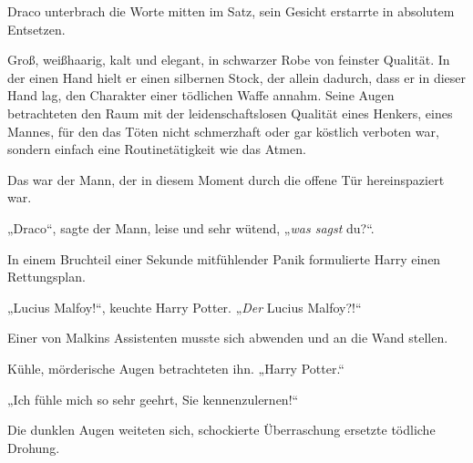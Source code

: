 Draco unterbrach die Worte mitten im Satz, sein Gesicht erstarrte in absolutem Entsetzen.

Groß, weißhaarig, kalt und elegant, in schwarzer Robe von feinster Qualität. In der einen Hand hielt er einen silbernen Stock, der allein dadurch, dass er in dieser Hand lag, den Charakter einer tödlichen Waffe annahm. Seine Augen betrachteten den Raum mit der leidenschaftslosen Qualität eines Henkers, eines Mannes, für den das Töten nicht schmerzhaft oder gar köstlich verboten war, sondern einfach eine Routinetätigkeit wie das Atmen.

Das war der Mann, der in diesem Moment durch die offene Tür hereinspaziert war.

„Draco“, sagte der Mann, leise und sehr wütend, „\emph{was sagst} du?“.

In einem Bruchteil einer Sekunde mitfühlender Panik formulierte Harry einen Rettungsplan.

„Lucius Malfoy!“, keuchte Harry Potter. „\emph{Der} Lucius Malfoy?!“

Einer von Malkins Assistenten musste sich abwenden und an die Wand stellen.

Kühle, mörderische Augen betrachteten ihn. „Harry Potter.“

„Ich fühle mich so sehr geehrt, Sie kennenzulernen!“

Die dunklen Augen weiteten sich, schockierte Überraschung ersetzte tödliche Drohung.

